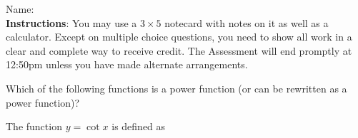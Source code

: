 \documentclass[addpoints]{exam}
\begin{document}
		
\vspace*{0pt}

\noindent
Name: \underline{\hspace{2in}} \\


\noindent
\textbf{Instructions}:  You may use a $3 \times 5$ notecard with notes on it as well as a calculator. Except on multiple choice questions, you need to show all work in a clear and complete way to receive credit. The Assessment will end promptly at 12:50pm unless you have made alternate arrangements. 

\begin{questions}


\question[2] Which of the following functions is a power function (or can be rewritten as a power function)? 

\question[2] The function $y = \cot x$ is defined as 
\end{questions}
\end{document}
